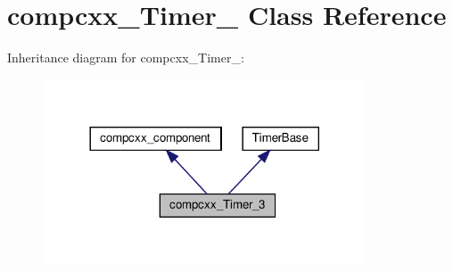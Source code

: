 \hypertarget{classcompcxx__Timer__3}{}\section{compcxx\+\_\+\+Timer\+\_ Class Reference}
\label{classcompcxx__Timer__3}


Inheritance diagram for compcxx\+\_\+\+Timer\+\_\+:\nopagebreak
\begin{figure}[H]
\begin{center}
\leavevmode
\includegraphics[width=272pt]{classcompcxx__Timer__3__inherit__graph}
\end{center}
\end{figure}


